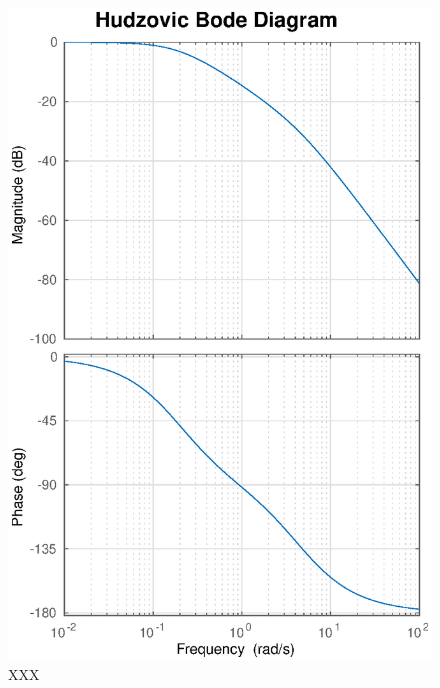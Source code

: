 \begin{figure}
    \centering
    \includegraphics[width=\linewidth]{images/hudzovic_bode}
    \caption{XXX}
\end{figure}


